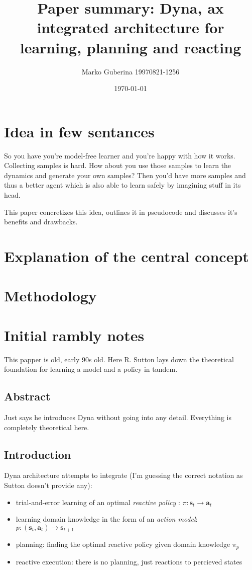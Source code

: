 \documentclass{article}
\title{Paper summary: Dyna, ax integrated architecture for learning, planning and reacting}
\date{\today}
\author{Marko Guberina 19970821-1256}
\begin{document}
\maketitle


\section{Idea in few sentances}
So you have you're model-free learner and you're happy with how it works.
Collecting samples is hard. How about you use those
samples to learn the dynamics and generate your own samples?
Then you'd have more samples and thus a better agent which is
also able to learn safely by imagining stuff in its head.

This paper concretizes this idea, outlines it in pseudocode and
discusses it's benefits and drawbacks.



\section{Explanation of the central concept}




\section{Methodology}


\section{Initial rambly notes}
This papper is old, early 90s old. Here R. Sutton lays down the theoretical foundation for learning a model and a policy in tandem.

\subsection{Abstract}
Just says he introduces Dyna without going into any detail.
Everything is completely theoretical here.

\subsection{Introduction}
Dyna architecture attempts to integrate (I'm guessing the correct notation as Sutton doesn't provide any):
\begin{itemize}
		\item trial-and-error learning of an optimal \textit{reactive policy} : $ \pi : \bm{s}_{t} \to \bm{a}_{t}  $
		\item learning domain knowledge in the form of an \textit{action model}: $ p : (\bm{s}_{t}, \bm{a}_{t} ) \to \bm{s}_{t+1}  $
		\item planning: finding the optimal reactive policy given domain knowledge $ \pi_{ p }  $
		\item reactive execution: there is no planning, just reactions to percieved states
\end{itemize}
\end{document}

